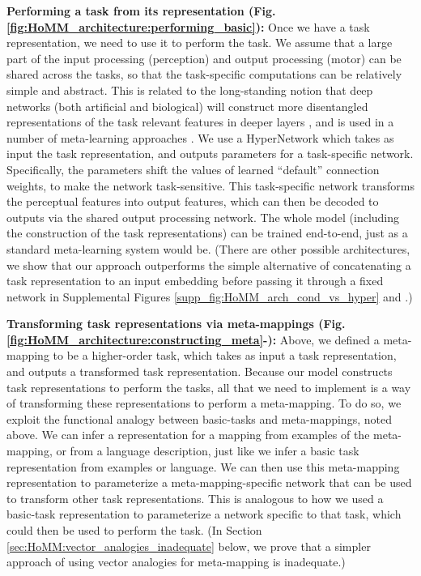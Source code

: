 \textbf{Performing a task from its representation (Fig. \ref{fig:HoMM_architecture:performing_basic}):} Once we have a task representation, we need to use it to perform the task. We assume that a large part of the input processing (perception) and output processing (motor) can be shared across the tasks, so that the task-specific computations can be relatively simple and abstract. This is related to the long-standing notion that deep networks (both artificial and biological) will construct more disentangled representations of the task relevant features in deeper layers \citep{Dicarlo2007, Erhan2010}, and is used in a number of meta-learning approaches \citep[e.g.]{Vinyals2016}. We use a HyperNetwork \citep{Ha2016} which takes as input the task representation, and outputs parameters for a task-specific network. Specifically, the parameters shift the values of learned ``default'' connection weights, to make the network task-sensitive. This task-specific network transforms the perceptual features into output features, which can then be decoded to outputs via the shared output processing network. The whole model (including the construction of the task representations) can be trained end-to-end, just as a standard meta-learning system would be. (There are other possible architectures, we show that our approach outperforms the simple alternative of concatenating a task representation to an input embedding before passing it through a fixed network in Supplemental Figures \ref{supp_fig:HoMM_arch_cond_vs_hyper} and \label{supp_fig:extending:RL:arch_cond_vs_hyper}.) 

\textbf{Transforming task representations via meta-mappings (Fig. \ref{fig:HoMM_architecture:constructing_meta}-):} Above, we defined a meta-mapping to be a higher-order task, which takes as input a task representation, and outputs a transformed task representation. Because our model constructs task representations to perform the tasks, all that we need to implement is a way of transforming these representations to perform a meta-mapping. To do so, we exploit the functional analogy between basic-tasks and meta-mappings, noted above. We can infer a representation for a mapping from examples of the meta-mapping, or from a language description, just like we infer a basic task representation from examples or language. We can then use this meta-mapping representation to parameterize a meta-mapping-specific network that can be used to transform other task representations. This is analogous to how we used a basic-task representation to parameterize a network specific to that task, which could then be used to perform the task. (In Section \ref{sec:HoMM:vector_analogies_inadequate} below, we prove that a simpler approach of using vector analogies for meta-mapping is inadequate.) 

